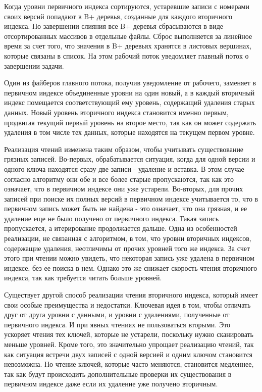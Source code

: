 \documentclass[a4paper,hidelinks,12pt]{article}
\begin{document}
Когда уровни первичного индекса сортируются, устаревшие записи с номерами своих
версий попадают в B+ деревья, созданные для каждого вторичного индекса. По
завершении слияния все B+ деревья сбрасываются в виде отсортированных массивов
в отдельные файлы. Сброс выполняется за линейное время за счет того, что
значения в B+ деревьях хранятся в листовых вершинах, которые связаны в список.
На этом рабочий поток уведомляет главный поток о завершении задачи.

Один из файберов главного потока, получив уведомление от рабочего, заменяет в
первичном индексе объединенные уровни на один новый, а в каждый вторичный индекс
помещается соответствующий ему уровень, содержащий удаления старых данных. Новый
уровень вторичного индекса становится именно первым, продвигая текущий первый
уровень на второе место, так как он может содержать удаления в том числе тех
данных, которые находятся на текущем первом уровне.

Реализация чтений изменена таким образом, чтобы учитывать существование грязных
записей. Во-первых, обрабатывается ситуация, когда для одной версии и одного
ключа находятся сразу две записи - удаление и вставка. В этом случае согласно
алгоритму они обе и все более старые пропускаются, так как это означает, что в
первичном индексе они уже устарели. Во-вторых, для прочих записей при поиске их
полных версий в первичном индексе учитывается то, что в первичном запись может
быть не найдена - это означает, что она грязная, и ее удаление еще не было
получено от первичного индекса. Такая запись пропускается, а итерирование
продолжается дальше. Одна из особенностей реализации, не связанная с алгоритмом,
в том, что уровни вторичных индексов, содержащие удаления, неотличимы от прочих
уровней того же индекса. За счет этого при чтении можно увидеть, что некоторая
запись уже удалена в первичном индексе, без ее поиска в нем. Однако это же
снижает скорость чтения вторичного индекса, так как требуется читать больше
уровней.

Существует другой способ реализации чтения вторичного индекса, который имеет
свои особые преимущества и недостатки. Ключевая идея в том, чтобы отличать
друг от друга уровни с данными, и уровни с удалениями, полученные от первичного
индекса. И при явных чтениях не пользоваться вторыми. Это ускоряет чтения тех
ключей, которые не устарели, поскольку нужно сканировать меньше уровней. Кроме
того, это значительно упрощает реализацию чтений, так как ситуация встречи
двух записей с одной версией и одним ключом становится невозможна. Но чтение
ключей, которые часто меняются, становится медленнее, так как будут происходить
дополнительные проверки их существования в первичном индексе даже если их
удаление уже получено вторичным.
\end{document}
